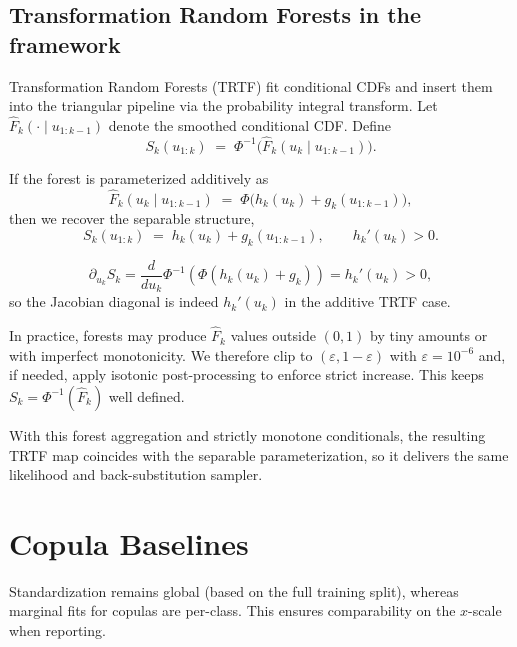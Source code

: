 \documentclass[11pt,a4paper,twoside]{book}\usepackage[]{graphicx}\usepackage[]{xcolor}
\begin{document}
\subsection{Transformation Random Forests in the framework}\label{sec:transport-trtf}

Transformation Random Forests (TRTF) fit conditional CDFs and insert them into the triangular pipeline via the probability integral transform. Let $\widehat F_k(\cdot \mid u_{1:k-1})$ denote the smoothed conditional CDF. Define
\begin{equation}
  S_k(u_{1:k}) \;=\; \Phi^{-1}\!\Big(\widehat F_k(u_k \mid u_{1:k-1})\Big).
  \label{eq:transport-trtf-map}
\end{equation}

If the forest is parameterized additively as
\begin{equation}
  \widehat F_k(u_k \mid u_{1:k-1}) \;=\; \Phi\!\big(h_k(u_k) + g_k(u_{1:k-1})\big),
  \label{eq:transport-trtf-additive}
\end{equation}
then we recover the separable structure,
\begin{equation}
  S_k(u_{1:k}) \;=\; h_k(u_k) + g_k(u_{1:k-1}), \qquad h_k'(u_k) > 0.
  \label{eq:transport-trtf-separable}
\end{equation}


\[
\partial_{u_k}S_k
= \frac{d}{du_k}\Phi^{-1}(\Phi(h_k(u_k)+g_k))
= h_k'(u_k) > 0,
\]
so the Jacobian diagonal is indeed $h_k'(u_k)$ in the additive TRTF case.


In practice, forests may produce $\widehat F_k$ values outside $(0,1)$ by tiny amounts or with imperfect monotonicity. We therefore clip to $(\varepsilon,1-\varepsilon)$ with $\varepsilon=10^{-6}$ and, if needed, apply isotonic post-processing to enforce strict increase. This keeps $S_k=\Phi^{-1}(\widehat F_k)$ well defined.

With this forest aggregation and strictly monotone conditionals, the resulting TRTF map coincides with the separable parameterization, so it delivers the same likelihood and back-substitution sampler.

\section{Copula Baselines}\label{sec:transport-copula}

Standardization remains global (based on the full training split), whereas marginal fits for copulas are per-class. This ensures comparability on the $x$-scale when reporting.
\end{document}
